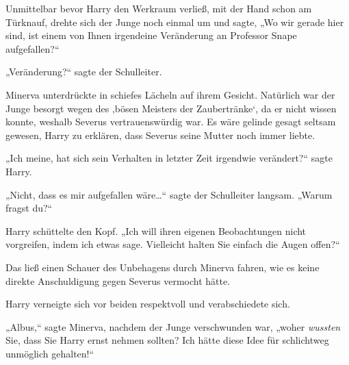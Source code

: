 Unmittelbar bevor Harry den Werkraum verließ, mit der Hand schon am Türknauf, drehte sich der Junge noch einmal um und sagte, „Wo wir gerade hier sind, ist einem von Ihnen irgendeine Veränderung an Professor Snape aufgefallen?“

„Veränderung?“ sagte der Schulleiter.

Minerva unterdrückte in schiefes Lächeln auf ihrem Gesicht. Natürlich war der Junge besorgt wegen des ‚bösen Meisters der Zaubertränke‘, da er nicht wissen konnte, weshalb Severus vertrauenswürdig war. Es wäre gelinde gesagt seltsam gewesen, Harry zu erklären, dass Severus seine Mutter noch immer liebte.

„Ich meine, hat sich sein Verhalten in letzter Zeit irgendwie verändert?“ sagte Harry.

„Nicht, dass es mir aufgefallen wäre…“ sagte der Schulleiter langsam. „Warum fragst du?“

Harry schüttelte den Kopf. „Ich will ihren eigenen Beobachtungen nicht vorgreifen, indem ich etwas sage. Vielleicht halten Sie einfach die Augen offen?“

Das ließ einen Schauer des Unbehagens durch Minerva fahren, wie es keine direkte Anschuldigung gegen Severus vermocht hätte.

Harry verneigte sich vor beiden respektvoll und verabschiedete sich.

\later

„Albus,“ sagte Minerva, nachdem der Junge verschwunden war, „woher \emph{wussten} Sie, dass Sie Harry ernst nehmen sollten? Ich hätte diese Idee für schlichtweg unmöglich gehalten!“


